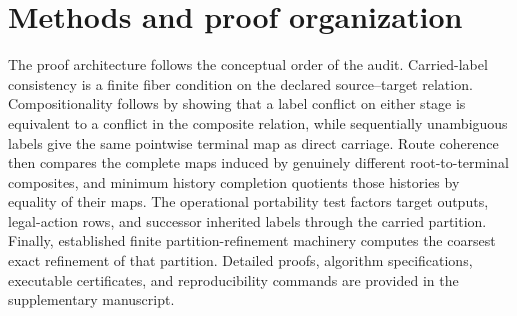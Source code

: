 \documentclass[11pt]{article}
\begin{document}
\section{Methods and proof organization}
The proof architecture follows the conceptual order of the audit. Carried-label consistency is a finite fiber condition on the declared source--target relation. Compositionality follows by showing that a label conflict on either stage is equivalent to a conflict in the composite relation, while sequentially unambiguous labels give the same pointwise terminal map as direct carriage. Route coherence then compares the complete maps induced by genuinely different root-to-terminal composites, and minimum history completion quotients those histories by equality of their maps. The operational portability test factors target outputs, legal-action rows, and successor inherited labels through the carried partition. Finally, established finite partition-refinement machinery computes the coarsest exact refinement of that partition. Detailed proofs, algorithm specifications, executable certificates, and reproducibility commands are provided in the supplementary manuscript.



\end{document}
